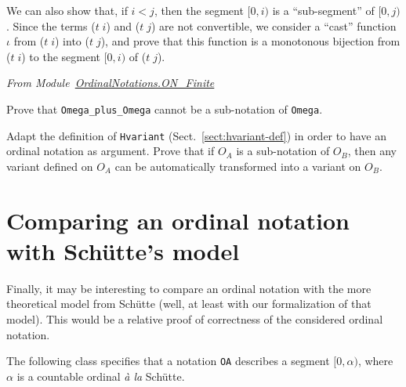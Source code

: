 We can also show that, if $i<j$, then the segment $[0,i)$ is a ``sub-segment'' of
$[0,j)$. Since the terms  ($t\;i$) and ($t\;j$) are not convertible, we consider a ``cast'' 
function $\iota$ from ($t\;i$) into ($t\;j$), and prove that this function is  a monotonous bijection  from ($t\;i$) to
the segment $[0,i)$ of ($t\;j$).




 




\vspace{4pt}
\noindent\emph{From Module~\href{../theories/html/hydras.OrdinalNotations.ON_Finite.html}{OrdinalNotations.ON\_Finite}}










\begin{exercise}
Prove that \texttt{Omega\_plus\_Omega} cannot be a sub-notation of \texttt{Omega}.
\end{exercise}

\begin{project}
Adapt the definition of \texttt{Hvariant} (Sect.~\ref{sect:hvariant-def}) in order to
have an ordinal notation as argument. Prove that if $O_A$ is a sub-notation of $O_B$, then any variant defined on  $O_A$ can be automatically transformed into 
a variant on $O_B$.
\end{project}




\section{Comparing an ordinal notation with Schütte's model}

Finally, it may be interesting to compare an ordinal notation with the more theoretical model from Schütte (well, at least with our formalization of that model). This would be a relative proof of correctness of the considered  ordinal  notation.

The following class specifies that a notation \texttt{OA} describes a segment $[0,\alpha)$,
where $\alpha$ is a countable ordinal \emph{à la}  Schütte.


\label{types:ON-for}

